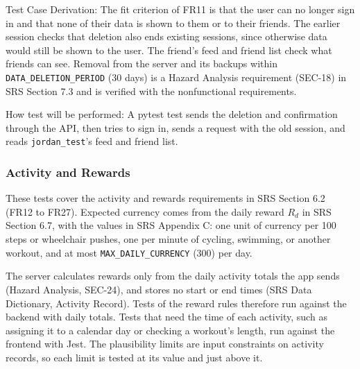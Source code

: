 \documentclass[12pt, titlepage]{article}
\begin{document}
\begin{enumerate}
Test Case Derivation: The fit criterion of FR11 is that the user can no
longer sign in and that none of their data is shown to them or to their
friends. The earlier session checks that deletion also ends existing sessions,
since otherwise data would still be shown to the user. The friend's feed and
friend list check what friends can see. Removal from the server and its
backups within \texttt{DATA\_DELETION\_PERIOD} (30 days) is a Hazard Analysis
requirement (SEC-18) in SRS Section 7.3 and is verified with the
nonfunctional requirements.

How test will be performed: A pytest test sends the deletion and
confirmation through the API, then tries to sign in, sends a request with the
old session, and reads \texttt{jordan\_test}'s feed and friend list.

\end{enumerate}

\subsubsection{Activity and Rewards}

These tests cover the activity and rewards requirements in SRS Section 6.2
(FR12 to FR27). Expected currency comes from the daily reward $R_d$ in SRS
Section 6.7, with the values in SRS Appendix C: one unit of currency per 100
steps or wheelchair pushes, one per minute of cycling, swimming, or another
workout, and at most \texttt{MAX\_DAILY\_CURRENCY} (300) per day.

The server calculates rewards only from the daily activity totals the app
sends (Hazard Analysis, SEC-24), and stores no start or end times (SRS Data
Dictionary, Activity Record). Tests of the reward rules therefore run against
the backend with daily totals. Tests that need the time of each activity,
such as assigning it to a calendar day or checking a workout's length, run
against the frontend with Jest. The plausibility limits are input constraints
on activity records, so each limit is tested at its value and just above it.
\end{document}
